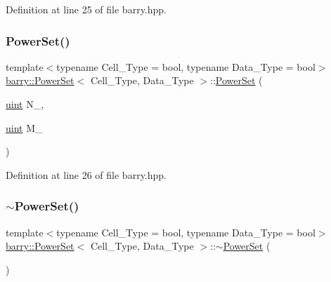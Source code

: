Definition at line 25 of file barry.\+hpp.

\mbox{\label{classbarry_1_1_power_set_a730140941912ef1b3ae1b5b85437268c}} 
\subsubsection{\texorpdfstring{Power\+Set()}{PowerSet()}\hspace{0.1cm}{\footnotesize\ttfamily [2/2]}}
{\footnotesize\ttfamily template$<$typename Cell\+\_\+\+Type  = bool, typename Data\+\_\+\+Type  = bool$>$ \\
\hyperlink{classbarry_1_1_power_set}{barry\+::\+Power\+Set}$<$ Cell\+\_\+\+Type, Data\+\_\+\+Type $>$\+::\hyperlink{classbarry_1_1_power_set}{Power\+Set} (\begin{DoxyParamCaption}\item[{\hyperlink{namespacebarry_a11dfc53ddb4672278319aa04f1e09a6c}{uint}}]{N\+\_\+,  }\item[{\hyperlink{namespacebarry_a11dfc53ddb4672278319aa04f1e09a6c}{uint}}]{M\+\_\+ }\end{DoxyParamCaption})\hspace{0.3cm}{\ttfamily [inline]}}



Definition at line 26 of file barry.\+hpp.

\mbox{\label{classbarry_1_1_power_set_a0fc9f4aeb2c780033f5909170f215c99}} 
\subsubsection{\texorpdfstring{$\sim$\+Power\+Set()}{~PowerSet()}}
{\footnotesize\ttfamily template$<$typename Cell\+\_\+\+Type  = bool, typename Data\+\_\+\+Type  = bool$>$ \\
\hyperlink{classbarry_1_1_power_set}{barry\+::\+Power\+Set}$<$ Cell\+\_\+\+Type, Data\+\_\+\+Type $>$\+::$\sim$\hyperlink{classbarry_1_1_power_set}{Power\+Set} (\begin{DoxyParamCaption}{ }\end{DoxyParamCaption})\hspace{0.3cm}{\ttfamily [inline]}}



